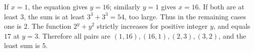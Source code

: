 If $x=1$, the equation gives $y=16$; similarly $y=1$ gives $x=16$. If both are at least $3$, the sum is at least $3^3+3^3=54$, too large. Thus in the remaining cases one is $2$. The function $2^y+y^2$ strictly increases for positive integer $y$, and equals $17$ at $y=3$. Therefore all pairs are $\boxed{(1,16),(16,1),(2,3),(3,2)}$, and the least sum is $\boxed5$.
